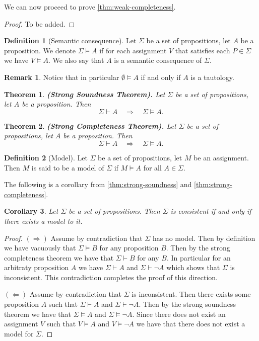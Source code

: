\documentclass[11pt,a4paper]{article}
\theoremstyle{definition}
\newtheorem{definition}{Definition}[section]
\newtheorem{remark}{Remark}[section]
\theoremstyle{plain}
\newtheorem{theorem}{Theorem}[section]
\newtheorem{corollary}[theorem]{Corollary}
\renewcommand{\tt}[1]{\textnormal{\textbf{(#1).}}} %
\begin{document}
  We can now proceed to prove \autoref{thm:weak-completeness}.
  \begin{proof}
    To be added.
  \end{proof}

  \begin{definition}[Semantic consequence]
    Let $\Sigma$ be a set of propositions, let $A$ be a proposition.
    We denote $\Sigma \models A$ if for each assignment $V$ that satisfies
    each $P \in \Sigma$ we have $V \models A$. We also say that $A$ is
    a semantic consequence of $\Sigma$.
  \end{definition}
  \begin{remark}
    Notice that in particular $\emptyset \models A$ if and only if $A$
    is a tautology.
  \end{remark}
  
  \begin{theorem}\label{thm:strong-soundness}\tt{Strong Soundness Theorem}
    Let $\Sigma$ be a set of propositions, let $A$ be a proposition.
    Then
    \[
      \Sigma \vdash A \quad\Rightarrow\quad \Sigma \models A.
    \]
  \end{theorem}

  \begin{theorem}\label{thm:strong-completeness}
    \tt{Strong Completeness Theorem}
    Let $\Sigma$ be a set of propositions, let $A$ be a proposition.
    Then
    \[
      \Sigma \vdash A \quad\Rightarrow\quad \Sigma \models A.
    \]
  \end{theorem}
  
  \begin{definition}[Model]
    Let $\Sigma$ be a set of propositions, let $M$ be an assignment.
    Then $M$ is said to be a model of $\Sigma$ if $M \models A$ 
    for all $A \in \Sigma$.
  \end{definition}

  The following is a corollary from \autoref{thm:strong-soundness}
  and \autoref{thm:strong-completeness}.
  \begin{corollary}
    Let $\Sigma$ be a set of propositions.
    Then $\Sigma$ is consistent if and only if there exists a model to it.
  \end{corollary}
  \begin{proof}
    $(\Rightarrow)$ Assume by contradiction that $\Sigma$ has no model.
    Then by definition we have vacuously that $\Sigma \models B$ for
    any proposition $B$. Then by the strong completeness theorem we have
    that $\Sigma \vdash B$ for any $B$. In particular for an arbitraty
    proposition $A$ we have $\Sigma \vdash A$ and $\Sigma \vdash \neg A$
    which shows that $\Sigma$ is inconsistent. This contradiction completes
    the proof of this direction.

    $(\Leftarrow)$ Assume by contradiction that $\Sigma$ is inconsistent.
    Then there exists some proposition $A$ such that $\Sigma \vdash A$
    and $\Sigma \vdash \neg A$. Then by the strong soundness theorem
    we have that $\Sigma \models A$ and $\Sigma \models \neg A$.
    Since there does not exist an assignment $V$ such that $V \models A$
    and $V \models \neg A$ we have that there does not exist a model
    for $\Sigma$.
  \end{proof}
\end{document}
